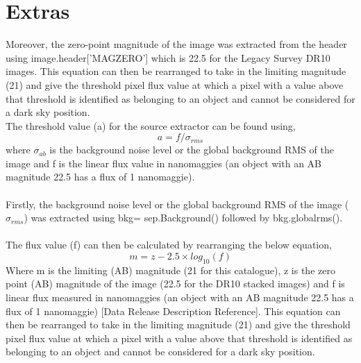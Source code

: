 \documentclass{article}
\begin{document}
 \section{Extras}
Moreover, the zero-point magnitude of the image was extracted from the header using image.header['MAGZERO'] which is 22.5 for the Legacy Survey DR10 images. This equation can then be rearranged to take in the limiting magnitude (21) and give the threshold pixel flux value at which a pixel with a value above that threshold is identified as belonging to an object and cannot be considered for a dark sky position.  \\
The threshold value (a) for the source extractor can be found using, \begin{equation} a=f/\sigma_{rms} \end{equation}
where $\sigma_{ab}$ is the background noise level or the global background RMS of the image and f is the linear flux value in nanomaggies (an object with an AB magnitude 22.5 has a flux of 1 nanomaggie).\\
\\Firstly, the background noise level or the global background RMS of the image ($\sigma_{rms}$) was extracted using bkg= sep.Background() followed by bkg.globalrms(). \\
\\The flux value (f) can then be calculated by rearranging the below equation,  \begin{equation} 
m=z-2.5\times log_{10}(f)
\end{equation} 
Where m is the limiting (AB) magnitude (21 for this catalogue), z is the zero point (AB) magnitude of the image (22.5 for the DR10 stacked images) and f is linear flux measured in nanomaggies (an object with an AB magnitude 22.5 has a flux of 1 nanomaggie) [Data Release Description Reference]. This equation can then be rearranged to take in the limiting magnitude (21) and give the threshold pixel flux value at which a pixel with a value above that threshold is identified as belonging to an object and cannot be considered for a dark sky position.
\end{document}

